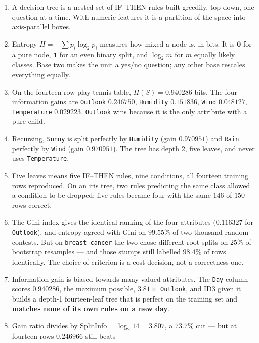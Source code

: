 \documentclass[11pt]{article}
\begin{document}
\begin{enumerate}[leftmargin=*]
  \item A decision tree is a nested set of IF--THEN rules built greedily,
    top-down, one question at a time. With numeric features it is a partition
    of the space into axis-parallel boxes.
  \item Entropy $H = -\sum p_i \log_2 p_i$ measures how mixed a node is, in
    bits. It is $\mathbf{0}$ for a pure node, $\mathbf{1}$ for an even binary
    split, and $\log_2 m$ for $m$ equally likely classes. Base two makes the
    unit a yes/no question; any other base rescales everything equally.
  \item On the fourteen-row play-tennis table, $H(S) = \mathbf{0.940286}$
    bits. The four information gains are \texttt{Outlook}
    $\mathbf{0.246750}$, \texttt{Humidity} $0.151836$, \texttt{Wind}
    $0.048127$, \texttt{Temperature} $0.029223$. \texttt{Outlook} wins because
    it is the only attribute with a pure child.
  \item Recursing, \texttt{Sunny} is split perfectly by \texttt{Humidity}
    (gain $0.970951$) and \texttt{Rain} perfectly by \texttt{Wind} (gain
    $0.970951$). The tree has depth 2, five leaves, and never uses
    \texttt{Temperature}.
  \item Five leaves means five IF--THEN rules, nine conditions, all fourteen
    training rows reproduced. On an iris tree, two rules predicting the same
    class allowed a condition to be dropped: five rules became four with the
    same $146$ of $150$ rows correct.
  \item The Gini index gives the identical ranking of the four attributes
    ($0.116327$ for \texttt{Outlook}), and entropy agreed with Gini on
    $\mathbf{99.55\%}$ of two thousand random contests. But on
    \texttt{breast\_cancer} the two chose different root splits on $25\%$ of
    bootstrap resamples --- and those stumps still labelled $98.4\%$ of rows
    identically. The choice of criterion is a cost decision, not a
    correctness one.
  \item Information gain is biased towards many-valued attributes. The
    \texttt{Day} column scores $\mathbf{0.940286}$, the maximum possible,
    $3.81\times$ \texttt{Outlook}, and ID3 given it builds a depth-1
    fourteen-leaf tree that is perfect on the training set and
    \textbf{matches none of its own rules on a new day}.
  \item Gain ratio divides by $\mathrm{SplitInfo} = \log_2 14 = 3.807$, a
    $73.7\%$ cut --- but at fourteen rows $0.246966$ still beats

\end{enumerate}
\end{document}
